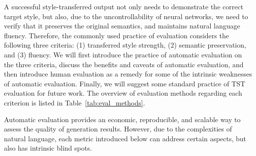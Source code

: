 \label{sec:eval}
A successful style-transferred output not only needs to demonstrate the correct target style, but also, due to the uncontrollability of neural networks, we need to verify that it preserves the original semantics, and maintains natural language fluency. Therefore, the commonly used practice of evaluation considers the following three criteria: (1) transferred style strength, (2) semantic preservation, and (3) fluency. 
We will first introduce the practice of automatic evaluation on the three criteria, discuss the benefits and caveats of automatic evaluation, and then introduce human evaluation as a remedy for some of the intrinsic weaknesses of automatic evaluation. Finally, we will suggest some standard practice of TST evaluation for future work. The overview of evaluation methods regarding each criterion is listed in Table~\ref{tab:eval_methods}.
\begin{table}[ht]
    \caption{Overview of evaluation methods for each criterion.}
    \label{tab:eval_methods}
    \centering
\end{table}

\label{sec:auto_eval}
Automatic evaluation provides an economic, reproducible, and scalable way to assess the quality of generation results. However, due to the complexities of natural language, each metric introduced below can address certain aspects, but also has intrinsic blind spots.


